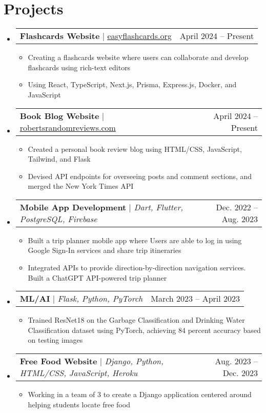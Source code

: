\documentclass[letterpaper,11pt]{article}
\makeatletter
\newcommand{\resumeItem}[1]{
  \item\small{
    {#1 \vspace{-2pt}}
  }
}
\newcommand{\resumeProjectHeading}[2]{
    \item
    \begin{tabular*}{0.97\textwidth}{l@{\extracolsep{\fill}}r}
      \small#1 & #2 \\
    \end{tabular*}\vspace{-7pt}
}
\newcommand{\resumeSubHeadingListStart}{\begin{itemize}[leftmargin=0.15in, label={}]}
\newcommand{\resumeSubHeadingListEnd}{\end{itemize}}
\newcommand{\resumeItemListStart}{\begin{itemize}}
\newcommand{\resumeItemListEnd}{\end{itemize}\vspace{-5pt}}
\makeatother
\begin{document}
\section{Projects}
    \resumeSubHeadingListStart
      \resumeProjectHeading
          {\textbf{Flashcards Website} $|$ \href{https://easyflashcards.org/}{\underline{easyflashcards.org}}}{April 2024 -- Present}
          \resumeItemListStart
            \resumeItem{Creating a flashcards website where users can collaborate and develop flashcards using rich-text editors}
            \resumeItem{Using React, TypeScript, Next.js, Prisma, Express.js, Docker, and JavaScript}
          \resumeItemListEnd
      \resumeProjectHeading
          {\textbf{Book Blog Website} $|$ \href{https://robertsrandomreviews.com/}{\underline{robertsrandomreviews.com}}}{April 2024 -- Present}
          \resumeItemListStart
            \resumeItem{Created a personal book review blog using HTML/CSS, JavaScript, Tailwind, and Flask}
            \resumeItem{Devised API endpoints for overseeing posts and comment sections, and merged the New York Times API}
          \resumeItemListEnd
        \resumeProjectHeading
          {\textbf{Mobile App Development} $|$ \emph{Dart, Flutter, PostgreSQL, Firebase}}{Dec. 2022 -- Aug. 2023}
          \resumeItemListStart
            \resumeItem{Built a trip planner mobile app where Users are able to log in using Google Sign-In services and share trip itineraries}
            \resumeItem{Integrated APIs to provide direction-by-direction navigation services. Built a ChatGPT API-powered trip planner}
          \resumeItemListEnd
        \resumeProjectHeading
          {\textbf{ML/AI} $|$ \emph{Flask, Python, PyTorch}}{March 2023 -- April 2023}
          \resumeItemListStart
            \resumeItem{Trained ResNet18 on the Garbage Classification and Drinking Water Classification dataset using PyTorch, achieving 84 percent accuracy based on testing images}
          \resumeItemListEnd
        \resumeProjectHeading
          {\textbf{Free Food Website} $|$ \emph{Django, Python, HTML/CSS, JavaScript, Heroku}}{Aug. 2023 -- Dec. 2023}
          \resumeItemListStart
            \resumeItem{Working in a team of 3 to create a Django application centered around helping students locate free food}
          \resumeItemListEnd
    \resumeSubHeadingListEnd



%
\end{document}
